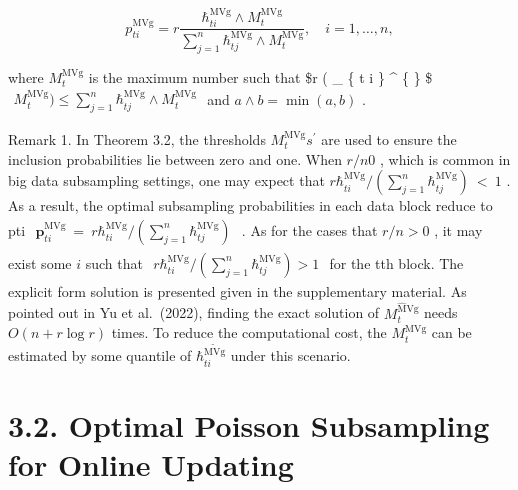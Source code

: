 \documentclass[
  10
]{article}
\begin{document}
\[
p _ { t i } ^ { \mathrm { M V g } } = r \frac { \hbar _ { t i } ^ { \mathrm { M V g } } \wedge M _ { t } ^ { \mathrm { M V g } } } { \sum _ { j = 1 } ^ { n } \hbar _ { t j } ^ { \mathrm { M V g } } \wedge M _ { t } ^ { \mathrm { M V g } } } , \quad i = 1 , \dots , n ,
\]

where \(M _ { t } ^ { \mathrm { M V g } }\) is the maximum number such
that \$r ( \_ \{ t i \} \^{} \{ \} \$
\(\begin{array} { r } { M _ { t } ^ { \mathrm { M V g } } ) \leq \sum _ { j = 1 } ^ { n } \hbar _ { t j } ^ { \mathrm { M V g } } \wedge M _ { t } ^ { \mathrm { M V g } } } \end{array}\)
and \(a \wedge b = \operatorname* { m i n } ( a , b )\) .

Remark 1. In Theorem 3.2, the thresholds
\(M _ { t } ^ { \mathrm { M V g } } s ^ { \prime }\) are used to ensure
the inclusion probabilities lie between zero and one. When \(r / n  0\)
, which is common in big data subsampling settings, one may expect that
\(r \hbar _ { t i } ^ { \mathrm { M V g } } / ( \sum _ { j = 1 } ^ { n } \hbar _ { t j } ^ { \mathrm { M V g } } ) ~ < ~ 1\)
. As a result, the optimal subsampling probabilities in each data block
reduce to pti
\(\begin{array} { r } { \boldsymbol { p } _ { t i } ^ { \mathrm { M V g } } ~ = ~ { r } \hbar _ { t i } ^ { \mathrm { M V g } } / ( \sum _ { j = 1 } ^ { n } \hbar _ { t j } ^ { \mathrm { M V g } } ) } \end{array}\)
. As for the cases that \(r / n > 0\) , it may exist some \(i\) such
that
\(\begin{array} { r } { r \hbar _ { t i } ^ { \mathrm { M V g } } / ( \sum _ { j = 1 } ^ { n } \hbar _ { t j } ^ { \mathrm { M V g } } ) > 1 } \end{array}\)
for the tth block. The explicit form solution is presented given in the
supplementary material. As pointed out in Yu et al.~(2022), finding the
exact solution of \(M _ { t } ^ { \mathrm { { \hat { M } V g } } }\)
needs \(O ( n + r \log r )\) times. To reduce the computational cost,
the \(M _ { t } ^ { \mathrm { M V g } }\) can be estimated by some
quantile of \(\hbar _ { t i } ^ { \mathrm { \tilde { M V g } } }\) under
this scenario.

\section{3.2. Optimal Poisson Subsampling for Online
Updating}\label{optimal-poisson-subsampling-for-online-updating}
\end{document}
